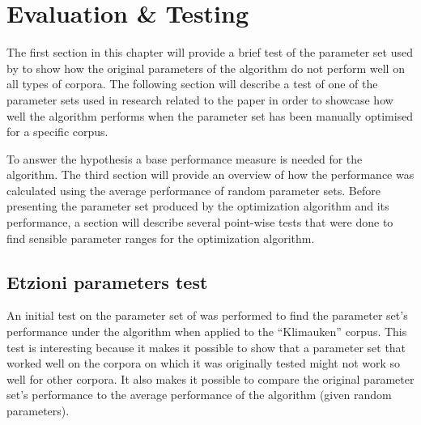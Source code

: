 

\chapter{Evaluation \& Testing} %

\label{EvaluationTesting} %


The first section in this chapter will provide a brief test of the parameter set used by \cite{Oren1998} to show how the original parameters of the \STC algorithm do not perform well on all types of corpora. The following section will describe a test of one of the parameter sets used in research related to the  paper in order to showcase how well the algorithm performs when the parameter set has been manually optimised for a specific corpus.

To answer the hypothesis a base performance measure is needed for the algorithm. The third section will provide an overview of how the performance was calculated using the average performance of random parameter sets. Before presenting the parameter set produced by the optimization algorithm and its performance, a section will describe several point-wise tests that were done to find sensible parameter ranges for the optimization algorithm.

\section{Etzioni parameters test}
An initial test on the parameter set of \citeauthor{Oren1998} was performed to find the parameter set's performance under the \CTC algorithm when applied to the ``Klimauken'' corpus. This test is interesting because it makes it possible to show that a parameter set that worked well on the corpora on which it was originally tested might not work so well for other corpora. It also makes it possible to compare the original parameter set's performance to the average performance of the algorithm (given random parameters).

